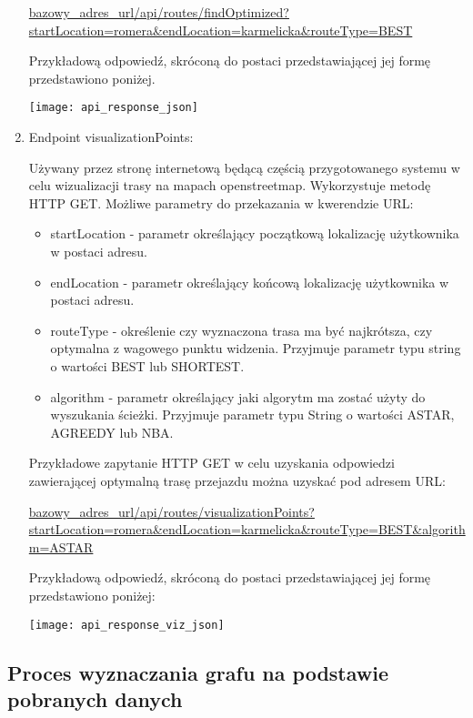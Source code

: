 \begin{enumerate}
\url{bazowy_adres_url/api/routes/findOptimized?startLocation=romera&endLocation=karmelicka&routeType=BEST}

Przykładową odpowiedź, skróconą do postaci przedstawiającej jej formę przedstawiono poniżej.

\begin{center}
\texttt{[image: api\_response\_json]}
\end{center}

\item Endpoint visualizationPoints:

Używany przez stronę internetową będącą częścią przygotowanego systemu w celu wizualizacji trasy na mapach openstreetmap. Wykorzystuje metodę HTTP GET. Możliwe parametry do przekazania w kwerendzie URL:

\begin{itemize}
\item startLocation - parametr określający początkową lokalizację użytkownika w postaci adresu.
\item endLocation - parametr określający końcową lokalizację użytkownika w postaci adresu.
\item routeType - określenie czy wyznaczona trasa ma być najkrótsza, czy optymalna z wagowego punktu widzenia. Przyjmuje parametr typu string o wartości BEST lub SHORTEST.
\item algorithm - parametr określający jaki algorytm ma zostać użyty do wyszukania ścieżki. Przyjmuje parametr typu String o wartości ASTAR, AGREEDY lub NBA.
\end{itemize}

Przykładowe zapytanie HTTP GET w celu uzyskania odpowiedzi zawierającej optymalną trasę przejazdu można uzyskać pod adresem URL:

\url{bazowy_adres_url/api/routes/visualizationPoints?startLocation=romera&endLocation=karmelicka&routeType=BEST&algorithm=ASTAR}

Przykładową odpowiedź, skróconą do postaci przedstawiającej jej formę przedstawiono poniżej:

\begin{center}
\texttt{[image: api\_response\_viz\_json]}
\end{center}

\end{enumerate}

\subsection{Proces wyznaczania grafu na podstawie pobranych danych}

